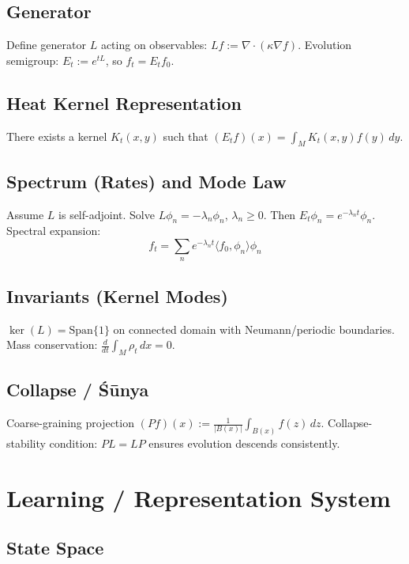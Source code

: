 \documentclass[12pt, oneside]{article}
\begin{document}
\subsection{Generator}

Define generator $L$ acting on observables: $Lf := \nabla \cdot (\kappa \nabla f)$. Evolution semigroup: $E_t := e^{tL}$, so $f_t = E_t f_0$.

\subsection{Heat Kernel Representation}

There exists a kernel $K_t(x,y)$ such that $(E_t f)(x) = \int_M K_t(x,y) f(y) \, dy$.

\subsection{Spectrum (Rates) and Mode Law}

Assume $L$ is self-adjoint. Solve $L \phi_n = -\lambda_n \phi_n$, $\lambda_n \geq 0$. Then $E_t \phi_n = e^{-\lambda_n t} \phi_n$. Spectral expansion:
\begin{equation}
f_t = \sum_n e^{-\lambda_n t} \langle f_0, \phi_n \rangle \phi_n
\end{equation}

\subsection{Invariants (Kernel Modes)}

$\ker(L) = \text{Span}\{1\}$ on connected domain with Neumann/periodic boundaries. Mass conservation: $\frac{d}{dt} \int_M \rho_t \, dx = 0$.

\subsection{Collapse / Śūnya}

Coarse-graining projection $(Pf)(x) := \frac{1}{|B(x)|} \int_{B(x)} f(z) \, dz$. Collapse-stability condition: $PL = LP$ ensures evolution descends consistently.

\section{Learning / Representation System}

\subsection{State Space}
\end{document}
